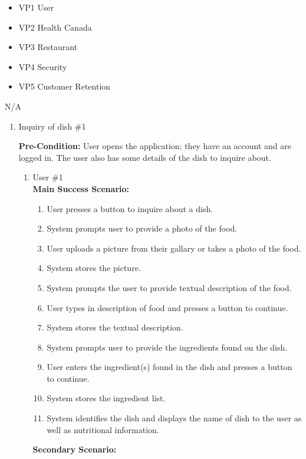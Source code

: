 \documentclass[]{article}
\begin{document}
\begin{itemize}
	\item VP1 User
	\item VP2 Health Canada
	\item VP3 Restaurant
	\item VP4 Security
	\item VP5 Customer Retention
\end{itemize}

 N/A \\

\begin{enumerate}[{\bf BE1.}]
	\item Inquiry of dish \#1
	
	\textbf{Pre-Condition:} User opens the application; they have an account and are logged in. The user also has some details of the dish to inquire about.
		\begin{enumerate}[{\bf VP1.}]
			\item User \#1 \\
				\textbf{Main Success Scenario:} 
				\begin{enumerate}[{1.}]
					\item User presses a button to inquire about a dish.
					\item System prompts user to provide a photo of the food.
					\item User uploads a picture from their gallary or takes a photo of the food.
					\item System stores the picture.
					\item System prompts the user to provide textual description of the food.
					\item User types in description of food and presses a button to continue.
					\item System stores the textual description.
					\item System prompts user to provide the ingredients found on the dish.
					\item User enters the ingredient(s) found in the dish and presses a button to continue.
					\item System stores the ingredient list.
					\item System identifies the dish and displays the name of dish to the user as well as nutritional information.
				\end{enumerate}
				\textbf{Secondary Scenario:}
				\begin{enumerate}

\end{enumerate}
\end{enumerate}
\end{enumerate}
\end{document}

